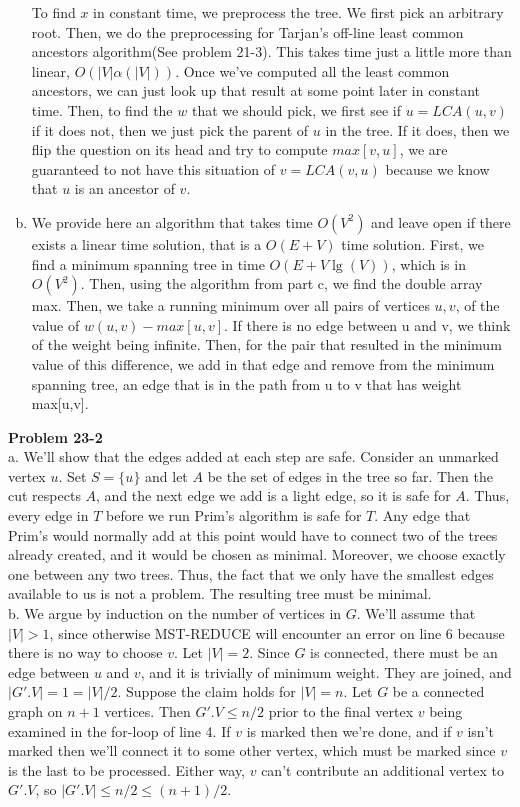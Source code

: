 \documentclass{article}
\begin{document}
\begin{enumerate}[a.]
To find $x$ in constant time, we preprocess the tree. We first pick an arbitrary root. Then, we do the preprocessing for Tarjan's off-line least common ancestors algorithm(See problem 21-3). This takes time just a little more than linear, $O(|V|\alpha(|V|))$. Once we've computed all the least common ancestors, we can just look up that result at some point later in constant time. Then, to find the $w$ that we should pick, we first see if $u=LCA(u,v)$ if it does not, then we just pick the parent of $u$ in the tree. If it does, then we flip the question on its head and try to compute $max[v,u]$, we are guaranteed to not have this situation of $v=LCA(v,u)$ because we know that $u$ is an ancestor of $v$.\\

\item
We provide here an algorithm that takes time $O(V^2)$ and leave open if there exists a linear time solution, that is a $O(E+V)$ time solution. First, we find a minimum spanning tree in time $O(E+V\lg(V))$, which is in $O(V^2)$. Then, using the algorithm from part c, we find the double array max. Then, we take a running minimum over all pairs of vertices $u,v$, of the value of $w(u,v) - max[u,v]$. If there is no edge between u and v, we think of the weight being infinite. Then, for the pair that resulted in the minimum value of this difference, we add in that edge and remove from the minimum spanning tree, an edge that is in the path from u to v that has weight max[u,v].
\end{enumerate}

\noindent\textbf{Problem 23-2}\\

a. We'll show that the edges added at each step are safe.  Consider an unmarked vertex $u$.  Set $S = \{u\}$ and let $A$ be the set of edges in the tree so far.  Then the cut respects $A$, and the next edge we add is a light edge, so it is safe for $A$.  Thus, every edge in $T$ before we run Prim's algorithm is safe for $T$.  Any edge that Prim's would normally add at this point would have to connect two of the trees already created, and it would be chosen as minimal.  Moreover, we choose exactly one between any two trees.  Thus, the fact that we only have the smallest edges available to us is not a problem.  The resulting tree must be minimal. \\

b. We argue by induction on the number of vertices in $G$.  We'll assume that $|V| > 1$, since otherwise MST-REDUCE will encounter an error on line 6 because there is no way to choose $v$.  Let $|V| = 2$.  Since $G$ is connected, there must be an edge between $u$ and $v$, and it is trivially of minimum weight.  They are joined, and $|G'.V| = 1 = |V|/2$.  Suppose the claim holds for $|V| = n$.  Let $G$ be a connected graph on $n+1$ vertices.  Then $G'.V \leq n/2$ prior to the final vertex $v$ being examined in the for-loop of line 4.  If $v$ is marked then we're done, and if $v$ isn't marked then we'll connect it to some other vertex, which must be marked since $v$ is the last to be processed.  Either way, $v$ can't contribute an additional vertex to $G'.V$, so $|G'.V| \leq n/2 \leq (n+1)/2$. \\
\end{document}
